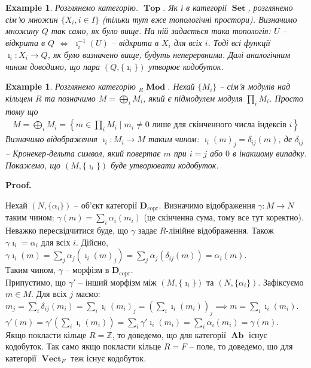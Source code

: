 \documentclass[a4paper, 10pt]{article}
\makeatletter
\theoremstyle{theoremdd}
\newtheorem{example}[theorem]{Example}
\renewenvironment{proof}[1][Proof.\\]{\par
\pushQED{\hfill \qed}%
\normalfont \topsep6\p@\@plus6\p@\relax
\trivlist
\item\relax
{\bfseries
#1\@addpunct{.}}\hspace\labelsep\ignorespaces
}{%
\popQED\endtrivlist\@endpefalse
}
\DeclareMathOperator{\Set}{\textbf{Set}}
\DeclareMathOperator{\Ab}{\textbf{Ab}}
\DeclareMathOperator{\Top}{\textbf{Top}}
\DeclareMathOperator{\Mod}{\textbf{Mod}}
\DeclareMathOperator{\Vect}{\textbf{Vect}}
\makeatother
\begin{document}
\begin{example}
Розглянемо категорію. $\Top$. Як і в категорії $\Set$, розглянемо сім'ю множин $\{X_i, i \in I\}$ (тільки тут вже топологічні простори). Визначимо множину $Q$ так само, як було вище. На ній задається така топологія: $U$ -- відкрита в $Q$ $\iff$ $\imath_i^{-1}(U)$ -- відкрита в $X_i$ для всіх $i$. Тоді всі функції $\imath_i \colon X_i \to Q$, як було визначено вище, будуть неперервними. Далі аналогічним чином доводимо, що пара $(Q,\{\imath_i\})$ утворює кодобуток.
\end{example}

\begin{example}
Розглянемо категорію ${}_R \Mod$. Нехай $\{M_i\}$ -- сім'я модулів над кільцем $R$ та позначимо $M = \displaystyle\bigoplus_{i} M_i$, який є підмодулем модуля $\displaystyle\prod_{i} M_i$. Просто тому що
\begin{align*}
M = \bigoplus_{i} M_i = \left\{ m \in \prod_{i} M_i \mid m_i \neq 0 \text{ лише для скінченного числа індексів } i \right\}
\end{align*}
Визначимо відображення $\imath_i \colon M_i \to M$ таким чином: $\imath_i(m)_j = \delta_{ij}(m)$, де $\delta_{ij}$ -- Кронекер-дельта символ, який повертає $m$ при $i = j$ або $0$ в інакшому випадку. Покажемо, що $(M,\{\imath_i\})$ буде утворювати кодобуток.
\end{example}

\begin{proof}
Нехай $(N,\{\alpha_i\})$ -- об'єкт категорії $\textbf{D}_{\text{copr}}$. Визначимо відображення $\gamma \colon M \to N$ таким чином: $\gamma(m) = \displaystyle\sum_i \alpha_i(m_i)$ (це скінченна сума, тому все тут коректно). Неважко пересвідчитися буде, що $\gamma$ задає $R$-лінійне відображення. Також $\gamma \imath_i = \alpha_i$ для всіх $i$. Дійсно,\\
$\gamma \imath_i(m) = \displaystyle\sum_{j} \alpha_j(\imath_i(m)_j) = \sum_j \alpha_j(\delta_{ij}(m)) = \alpha_i(m)$.\\
Таким чином, $\gamma$ -- морфізм в $\textbf{D}_{\text{copr}}$.\\
Припустимо, що $\gamma'$ -- інший морфізм між $(M,\{\imath_i\})$ та $(N,\{\alpha_i\})$. Зафіксуємо $m \in M$. Для всіх $j$ маємо:\\
$m_j = \displaystyle\sum_i \delta_{ij}(m_i) = \sum_{i} \imath_i(m_i)_j = \left( \sum_{i} \imath_i(m_i) \right)_j \implies m = \sum_i \imath_i(m_i)$.\\
$\gamma'(m) = \displaystyle\gamma'\left( \sum_i \imath_i(m_i) \right) = \sum_i \gamma' \imath_i(m_i) = \sum_i \alpha_i(m_i) = \gamma(m)$.
\bigskip \\
Якщо покласти кільце $R = \mathbb{Z}$, то доведемо, що для категорії $\Ab$ існує кодобуток. Так само якщо покласти кільце $R = F$ -- поле, то доведемо, що для категорії $\Vect_F$ теж існує кодобуток.
\end{proof}
\end{document}

